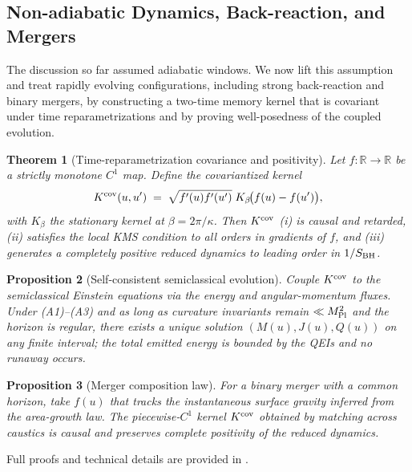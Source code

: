 \documentclass[11pt,a4paper]{article}
\theoremstyle{plain}
\newtheorem{theorem}{Theorem}
\newtheorem{proposition}[theorem]{Proposition}
\theoremstyle{definition}
\theoremstyle{remark}
\begin{document}
\subsection{Non-adiabatic Dynamics, Back-reaction, and Mergers}
\label{sec:nonadiabatic-main}
The discussion so far assumed adiabatic windows. We now lift this assumption and treat rapidly evolving configurations, including strong back-reaction and binary mergers, by constructing a two-time memory kernel that is covariant under time reparametrizations and by proving well-posedness of the coupled evolution.

\begin{theorem}[Time-reparametrization covariance and positivity]
\label{thm:nonadiabatic-covariance}
Let $f:\mathbb{R}\to\mathbb{R}$ be a strictly monotone $C^1$ map. Define the covariantized kernel
\[
K^{\rm cov}(u,u')\;=\;\sqrt{f'(u)f'(u')}\;K_\beta\!\big(f(u)-f(u')\big),
\]
with $K_\beta$ the stationary kernel at $\beta=2\pi/\kappa$. Then $K^{\rm cov}$ (i) is causal and retarded, (ii) satisfies the local KMS condition to all orders in gradients of $f$, and (iii) generates a completely positive reduced dynamics to leading order in $1/S_{\rm BH}$. 
\end{theorem}

\begin{proposition}[Self-consistent semiclassical evolution]\label{prop:self-consistent}
Couple $K^{\rm cov}$ to the semiclassical Einstein equations via the energy and angular-momentum fluxes. Under (A1)--(A3) and as long as curvature invariants remain $\ll M_{\rm Pl}^2$ and the horizon is regular, there exists a unique solution $(M(u),J(u),Q(u))$ on any finite interval; the total emitted energy is bounded by the QEIs and no runaway occurs.
\end{proposition}

\begin{proposition}[Merger composition law]\label{prop:merger}
For a binary merger with a common horizon, take $f(u)$ that tracks the instantaneous surface gravity inferred from the area-growth law. The piecewise-$C^1$ kernel $K^{\rm cov}$ obtained by matching across caustics is causal and preserves complete positivity of the reduced dynamics.
\end{proposition}

Full proofs and technical details are provided in .
\end{document}
